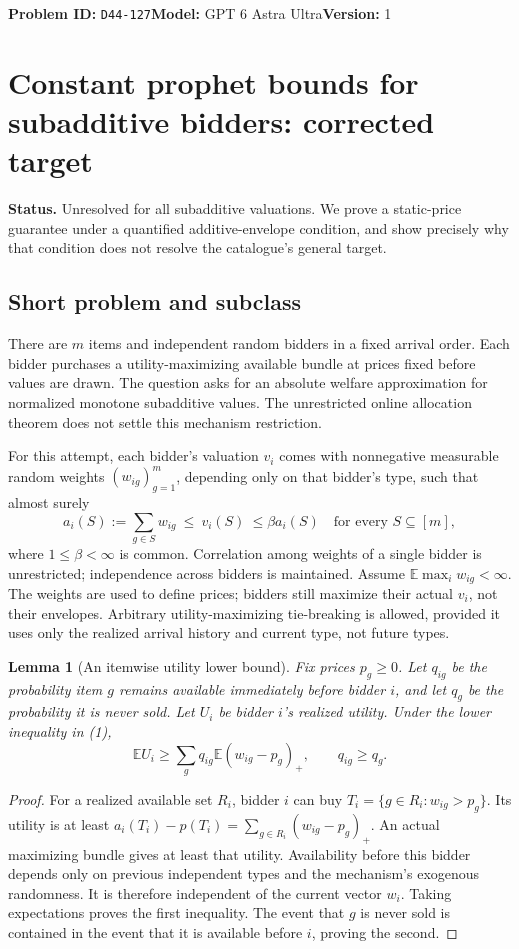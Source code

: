 \documentclass[11pt,a4paper]{article}
\newtheorem{lemma}[theorem]{Lemma}
\newcommand{\E}{\mathbb E}
\begin{document}
\noindent\textbf{Problem ID:} \texttt{D44-127}\quad\textbf{Model:} GPT 6 Astra Ultra\quad\textbf{Version:} 1\par
\section*{Constant prophet bounds for subadditive bidders: corrected target}

\textbf{Status.} Unresolved for all subadditive valuations. We prove a static-price guarantee under a quantified additive-envelope condition, and show precisely why that condition does not resolve the catalogue's general target.

\subsection*{Short problem and subclass}
There are $m$ items and independent random bidders in a fixed arrival order. Each bidder purchases a utility-maximizing available bundle at prices fixed before values are drawn. The question asks for an absolute welfare approximation for normalized monotone subadditive values. The unrestricted online allocation theorem does not settle this mechanism restriction.

For this attempt, each bidder's valuation $v_i$ comes with nonnegative measurable random weights $(w_{ig})_{g=1}^m$, depending only on that bidder's type, such that almost surely
\[
 a_i(S):=\sum_{g\in S}w_{ig}\ \leq\ v_i(S)\ \leq\beta a_i(S)
 \quad\text{for every }S\subseteq[m],                         \tag{1}
\]
where $1\leq\beta<\infty$ is common. Correlation among weights of a single bidder is unrestricted; independence across bidders is maintained. Assume $\E\max_i w_{ig}<\infty$. The weights are used to define prices; bidders still maximize their actual $v_i$, not their envelopes. Arbitrary utility-maximizing tie-breaking is allowed, provided it uses only the realized arrival history and current type, not future types.

\begin{lemma}[An itemwise utility lower bound]
Fix prices $p_g\geq0$. Let $q_{ig}$ be the probability item $g$ remains available immediately before bidder $i$, and let $q_g$ be the probability it is never sold. Let $U_i$ be bidder $i$'s realized utility. Under the lower inequality in (1),
\[
 \E U_i\geq\sum_g q_{ig}\E(w_{ig}-p_g)_+,
 \qquad q_{ig}\geq q_g.
\]
\end{lemma}
\begin{proof}
For a realized available set $R_i$, bidder $i$ can buy
$T_i=\{g\in R_i:w_{ig}>p_g\}$. Its utility is at least
$a_i(T_i)-p(T_i)=\sum_{g\in R_i}(w_{ig}-p_g)_+$. An actual maximizing bundle gives at least that utility. Availability before this bidder depends only on previous independent types and the mechanism's exogenous randomness. It is therefore independent of the current vector $w_i$. Taking expectations proves the first inequality. The event that $g$ is never sold is contained in the event that it is available before $i$, proving the second.
\end{proof}
\end{document}
